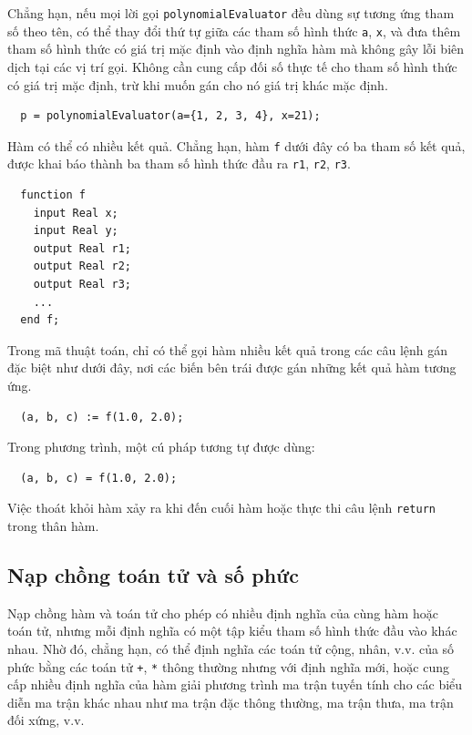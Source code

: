 Chẳng hạn, nếu mọi lời gọi \texttt{polynomialEvaluator} đều dùng sự tương ứng tham số theo tên, có thể thay đổi thứ tự giữa các tham số hình thức \texttt{a}, \texttt{x}, và đưa thêm tham số hình thức có giá trị mặc định vào định nghĩa hàm mà không gây lỗi biên dịch tại các vị trí gọi. Không cần cung cấp đối số thực tế cho tham số hình thức có giá trị mặc định, trừ khi muốn gán cho nó giá trị khác mặc định.
\begin{verbatim}
  p = polynomialEvaluator(a={1, 2, 3, 4}, x=21);
\end{verbatim}
Hàm có thể có nhiều kết quả. Chẳng hạn, hàm \texttt{f} dưới đây có ba tham số kết quả, được khai báo thành ba tham số hình thức đầu ra \texttt{r1}, \texttt{r2}, \texttt{r3}.
\begin{verbatim}
  function f
    input Real x;
    input Real y;
    output Real r1;
    output Real r2;
    output Real r3;
    ...
  end f;
\end{verbatim}
Trong mã thuật toán, chỉ có thể gọi hàm nhiều kết quả trong các câu lệnh gán đặc biệt như dưới đây, nơi các biến bên trái được gán những kết quả hàm tương ứng.
\begin{verbatim}
  (a, b, c) := f(1.0, 2.0);
\end{verbatim}
Trong phương trình, một cú pháp tương tự được dùng:
\begin{verbatim}
  (a, b, c) = f(1.0, 2.0);
\end{verbatim}
Việc thoát khỏi hàm xảy ra khi đến cuối hàm hoặc thực thi câu lệnh \texttt{return} trong thân hàm.

\subsection{Nạp chồng toán tử và số phức}
Nạp chồng hàm và toán tử cho phép có nhiều định nghĩa của cùng hàm hoặc toán tử, nhưng mỗi định nghĩa có một tập kiểu tham số hình thức đầu vào khác nhau. Nhờ đó, chẳng hạn, có thể định nghĩa các toán tử cộng, nhân, v.v. của số phức bằng các toán tử \texttt{+}, \texttt{*} thông thường nhưng với định nghĩa mới, hoặc cung cấp nhiều định nghĩa của hàm giải phương trình ma trận tuyến tính cho các biểu diễn ma trận khác nhau như ma trận đặc thông thường, ma trận thưa, ma trận đối xứng, v.v.

